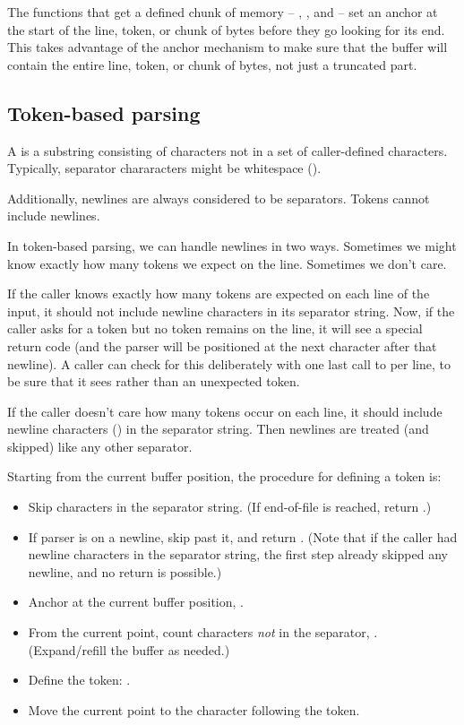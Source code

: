 The functions that get a defined chunk of memory --
, , and
 -- set an anchor at the start of the
line, token, or chunk of bytes before they go looking for its end.
This takes advantage of the anchor mechanism to make sure that the
buffer will contain the entire line, token, or chunk of bytes, not just a
truncated part.


\subsection{Token-based parsing}

A  is a substring consisting of characters not in a set
of caller-defined  characters. Typically, separator
chararacters might be whitespace ().

Additionally, newlines are always considered to be separators. Tokens
cannot include newlines. 

In token-based parsing, we can handle newlines in two ways. Sometimes
we might know exactly how many tokens we expect on the line. Sometimes
we don't care. 

If the caller knows exactly how many tokens are expected on each line
of the input, it should not include newline characters in its
separator string. Now, if the caller asks for a token but no token
remains on the line, it will see a special  return code
(and the parser will be positioned at the next character after that
newline). A caller can check for this deliberately with one last call
to  per line, to be sure that it sees
 rather than an unexpected token.

If the caller doesn't care how many tokens occur on each line, it
should include newline characters () in the separator
string. Then newlines are treated (and skipped) like any other
separator.

Starting from the current buffer position, the procedure for defining
a token is:

\begin{itemize}
\item Skip characters in the separator string. (If end-of-file is
      reached, return .)
\item If parser is on a newline, skip past it, and return
      . (Note that if the caller had newline characters
      in the separator string, the first step already skipped any
      newline, and no  return is possible.)
\item Anchor at the current buffer position, .
\item From the current point, count characters \emph{not} in the
      separator, . (Expand/refill the buffer as needed.)
\item Define the token: .
\item Move the current point to the character following the token.
\end{itemize}

